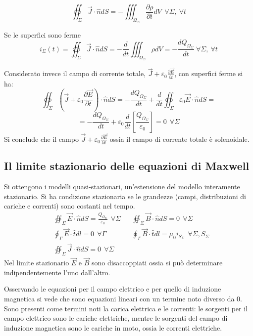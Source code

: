 \begin{equation}
\oiint_\Sigma\vec{J}\cdot\hat{n}dS = - \iiint_{\Omega_\Sigma}\frac{\partial \rho}{\partial t} dV
\ \ \forall\Sigma,\ \forall t
\end{equation}

Se le superfici sono ferme
$$
i_{\Sigma}(t) = \oiint_\Sigma\vec{J}\cdot\hat{n}dS = -\frac{d}{dt} \iiint_{\Omega_\Sigma} \rho dV = -\frac{dQ_{\Omega_\Sigma}}{dt}\ \forall\Sigma,\ \forall t
$$

Considerato invece il campo di corrente totale, $\vec{J} + \varepsilon_0\frac{\partial\vec{E}}{\partial t}$, con superfici ferme si ha:
$$
\oiint_{\Sigma} \left(\vec{J} + \varepsilon_0\frac{\partial\vec{E}}{\partial t}\right)\cdot\hat{n}dS = 
-\frac{dQ_{\Omega_\Sigma}}{dt} + \frac{d}{dt} \oiint_{\Sigma} \varepsilon_0\vec{E}\cdot\hat{n}dS =
$$
$$
= -\frac{dQ_{\Omega_\Sigma}}{dt} + \varepsilon_0\frac{d}{dt}\left[\frac{Q_{\Omega_\Sigma}}{\varepsilon_0}\right] = 0\ \ \forall\Sigma
$$
Si conclude che il campo $\vec{J} + \varepsilon_0\frac{\partial\vec{E}}{\partial t} $ ossia
il campo di corrente totale è solenoidale.

\newpage
\subsection{Il limite stazionario delle equazioni di Maxwell}
Si ottengono i modelli quasi-stazionari, un'estensione del modello interamente stazionario.
Si ha condizione stazionaria se le grandezze (campi, distribuzioni di cariche e correnti) sono 
costanti nel tempo.
\begin{align*}
&\oiint_{\Sigma}\vec{E}\cdot\hat{n}dS = \frac{Q_{\Omega_\Sigma}}{\varepsilon_0} \ \ \forall \Sigma &
&\oiint_{\Sigma}\vec{B}\cdot\hat{n}dS = 0 \ \ \forall\Sigma \\
&\oint_{\Gamma} \vec{E}\cdot\hat{t}dl = 0 \ \ \forall \Gamma &
&\oint_{\Gamma}\vec{B}\cdot\hat{t} dl = \mu_0 i_{S_\Sigma}\ \ \forall \Sigma,S_\Sigma \\
&\oiint_\Sigma \vec{J}\cdot\hat{n}dS = 0\ \ \forall\Sigma
\end{align*}
Nel limite stazionario $\vec{E}$ e $\vec{B}$ sono disaccoppiati ossia si può determinare
indipendentemente l'uno dall'altro.

Osservando le equazioni per il campo elettrico e per quello di induzione magnetica si vede 
che sono equazioni lineari con un termine noto diverso da 0.
Sono presenti come termini noti la carica elettrica e le correnti: le sorgenti
per il campo elettrico sono le cariche elettriche, mentre le sorgenti del campo di induzione magnetica
sono le cariche in moto, ossia le correnti elettriche.

